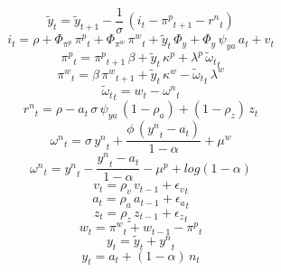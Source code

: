 \begin{dmath}
{{\tilde{y}}_{t}}={{\tilde{y}}_{t+1}}-\frac{1}{{{\sigma}}}\, \left({{i}_{t}}-{{\pi^p}_{t+1}}-{{r^n}_{t}}\right)
\end{dmath}
\begin{dmath}
{{i}_{t}}={{\rho}}+{{\Phi_{\pi^p}}}\, {{\pi^p}_{t}}+{{\Phi_{\pi^w}}}\, {{\pi^w}_{t}}+{{\tilde{y}}_{t}}\, {{\Phi_{y}}}+{{\Phi_{y}}}\, {{\psi_{ya}}}\, {{a}_{t}}+{{v}_{t}}
\end{dmath}
\begin{dmath}
{{\pi^p}_{t}}={{\pi^p}_{t+1}}\, {{\beta}}+{{\tilde{y}}_{t}}\, {{\kappa^p}}+{{\lambda^p}}\, {{\tilde{\omega}_t}_{t}}
\end{dmath}
\begin{dmath}
{{\pi^w}_{t}}={{\beta}}\, {{\pi^w}_{t+1}}+{{\tilde{y}}_{t}}\, {{\kappa^w}}-{{\tilde{\omega}_t}_{t}}\, {{\lambda^w}}
\end{dmath}
\begin{dmath}
{{\tilde{\omega}_t}_{t}}={{w}_{t}}-{{\omega^n}_{t}}
\end{dmath}
\begin{dmath}
{{r^n}_{t}}={{\rho}}-{{a}_{t}}\, {{\sigma}}\, {{\psi_{ya}}}\, \left(1-{{\rho_a}}\right)+\left(1-{{\rho_z}}\right)\, {{z}_{t}}
\end{dmath}
\begin{dmath}
{{\omega^n}_{t}}={{\sigma}}\, {{y^n}_{t}}+\frac{{{\phi}}\, \left({{y^n}_{t}}-{{a}_{t}}\right)}{1-{{\alpha}}}+{{\mu^w}}
\end{dmath}
\begin{dmath}
{{\omega^n}_{t}}={{y^n}_{t}}-\frac{{{y^n}_{t}}-{{a}_{t}}}{1-{{\alpha}}}-{{\mu^p}}+log\left(1-{{\alpha}}\right)
\end{dmath}
\begin{dmath}
{{v}_{t}}={{\rho_v}}\, {{v}_{t-1}}+{{\epsilon_v}_{t}}
\end{dmath}
\begin{dmath}
{{a}_{t}}={{\rho_a}}\, {{a}_{t-1}}+{{\epsilon_a}_{t}}
\end{dmath}
\begin{dmath}
{{z}_{t}}={{\rho_z}}\, {{z}_{t-1}}+{{\epsilon_z}_{t}}
\end{dmath}
\begin{dmath}
{{w}_{t}}={{\pi^w}_{t}}+{{w}_{t-1}}-{{\pi^p}_{t}}
\end{dmath}
\begin{dmath}
{{y}_{t}}={{\tilde{y}}_{t}}+{{y^n}_{t}}
\end{dmath}
\begin{dmath}
{{y}_{t}}={{a}_{t}}+\left(1-{{\alpha}}\right)\, {{n}_{t}}
\end{dmath}
